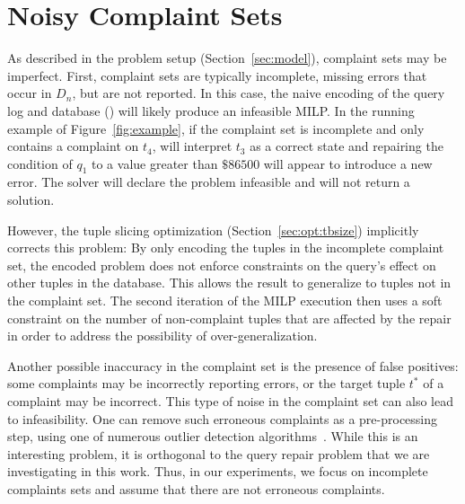 
\section{Noisy Complaint Sets}
\label{sec:noise}

As described in the problem setup (Section~\ref{sec:model}), complaint
sets may be imperfect. First, complaint sets are typically incomplete,
missing errors that occur in $D_n$, but are not reported. In this
case, the naive encoding of the query log and database (\naive) will
likely produce an infeasible MILP. In the running example of
Figure~\ref{fig:example}, if the complaint set is incomplete and only
contains a complaint on $t_4$, \naive will interpret $t_3$ as a
correct state and repairing the condition of $q_1$ to a value greater
than $\$86500$ will appear to introduce a new error. The solver will
declare the problem infeasible and will not return a solution.



However, the tuple slicing optimization (Section~\ref{sec:opt:tbsize})
implicitly corrects this problem: By only encoding the tuples in the
incomplete complaint set, the encoded problem does not enforce
constraints on the query's effect on other tuples in the database.
This allows the result to generalize to tuples not in the complaint
set. The second iteration of the MILP execution then uses a soft
constraint on the number of non-complaint tuples that are affected by
the repair in order to address the possibility of over-generalization.

Another possible inaccuracy in the complaint set is the presence of
false positives: some complaints may be incorrectly reporting errors,
or the target tuple $t^*$ of a complaint may be incorrect. This type
of noise in the complaint set can also lead to infeasibility. One can
remove such erroneous complaints as a pre-processing step, using one
of numerous outlier detection algorithms~\cite{????}. While this is an
interesting problem, it is orthogonal to the query repair problem that
we are investigating in this work. Thus, in our experiments, we focus
on incomplete complaints sets and assume that there are not erroneous
complaints.



